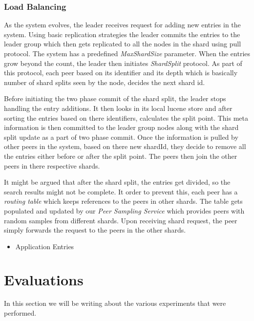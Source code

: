 \documentclass[a4paper, 11pt]{article}
\begin{document}
\subsubsection*{Load Balancing}

As the system evolves, the leader receives request for adding new entries in the system. Using basic replication strategies the leader commits the entries to the leader group which then gets replicated to all the nodes in the shard using pull protocol. The system has a predefined \textit{MaxShardSize} parameter. When the entries grow beyond the count, the leader then initiates \textit{ShardSplit} protocol. As part of this protocol, each peer based on its identifier and its depth which is basically number of shard splits seen by the node, decides the next shard id. 
\par Before initiating the two phase commit of the shard split, the leader stops handling the entry additions. It then looks in its local lucene store and after sorting the entries based on there identifiers, calculates the split point. This meta information is then committed to the leader group nodes along with the shard split update as a part of two phase commit. Once the information is pulled by other peers in the system, based on there new shardId, they decide to remove all the entries either before or after the split point. The peers then join the other peers in there respective shards. 
\par It might be argued that after the shard split, the entries get divided, so the search results might not be complete. It order to prevent this, each peer has a \textit{routing table} which keeps references to the peers in other shards. The table gets populated and updated by our \textit{Peer Sampling Service} which provides peers with random samples from different shards. Upon receiving shard request, the peer simply forwards the request to the peers in the other shards.

\begin{itemize}

\item Application Entries 

\end{itemize}


\newpage
\section{Evaluations}


In this section we will be writing about the various experiments that were performed.
\end{document}
